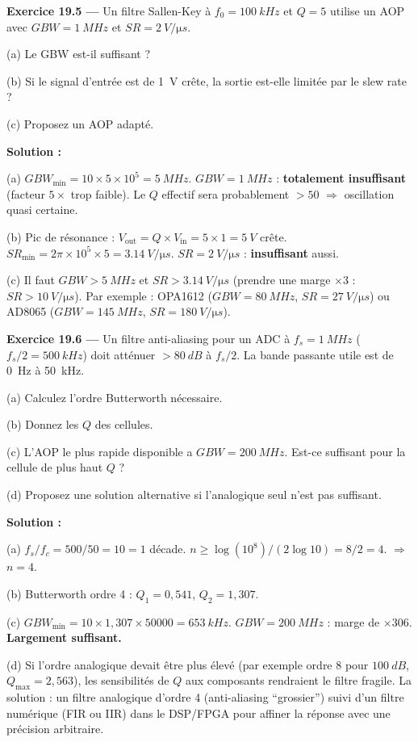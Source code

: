 \documentclass[12pt,a4paper,twoside]{book}
\begin{document}
\textbf{Exercice 19.5 ---} Un filtre Sallen-Key à $f_0 = \SI{100}{kHz}$ et $Q = 5$ utilise un AOP avec $GBW = \SI{1}{MHz}$ et $SR = \SI{2}{V/\micro s}$.

(a) Le GBW est-il suffisant ?

(b) Si le signal d'entrée est de \SI{1}{V} crête, la sortie est-elle limitée par le slew rate ?

(c) Proposez un AOP adapté.

\begin{pratique}
\textbf{Solution :}

(a) $GBW_{\min} = 10\times5\times10^5 = \SI{5}{MHz}$. $GBW = \SI{1}{MHz}$ : \textbf{totalement insuffisant} (facteur $5\times$ trop faible). Le $Q$ effectif sera probablement $> 50$ $\Rightarrow$ oscillation quasi certaine.

(b) Pic de résonance : $V_{\text{out}} = Q\times V_{\text{in}} = 5\times1 = \SI{5}{V}$ crête. $SR_{\min} = 2\pi\times10^5\times5 = \SI{3.14}{V/\micro s}$. $SR = \SI{2}{V/\micro s}$ : \textbf{insuffisant} aussi.

(c) Il faut $GBW > \SI{5}{MHz}$ et $SR > \SI{3.14}{V/\micro s}$ (prendre une marge $\times 3$ : $SR > \SI{10}{V/\micro s}$). Par exemple : OPA1612 ($GBW = \SI{80}{MHz}$, $SR = \SI{27}{V/\micro s}$) ou AD8065 ($GBW = \SI{145}{MHz}$, $SR = \SI{180}{V/\micro s}$).
\end{pratique}

\textbf{Exercice 19.6 ---} Un filtre anti-aliasing pour un ADC à $f_s = \SI{1}{MHz}$ ($f_s/2 = \SI{500}{kHz}$) doit atténuer $> \SI{80}{dB}$ à $f_s/2$. La bande passante utile est de \SI{0}{Hz} à \SI{50}{kHz}.

(a) Calculez l'ordre Butterworth nécessaire.

(b) Donnez les $Q$ des cellules.

(c) L'AOP le plus rapide disponible a $GBW = \SI{200}{MHz}$. Est-ce suffisant pour la cellule de plus haut $Q$ ?

(d) Proposez une solution alternative si l'analogique seul n'est pas suffisant.

\begin{pratique}
\textbf{Solution :}

(a) $f_s/f_c = 500/50 = 10 = 1$ décade. $n \geq \log(10^8)/(2\log10) = 8/2 = 4$. $\Rightarrow$ $n = 4$.

(b) Butterworth ordre 4 : $Q_1 = 0{,}541$, $Q_2 = 1{,}307$.

(c) $GBW_{\min} = 10\times1{,}307\times50000 = \SI{653}{kHz}$. $GBW = \SI{200}{MHz}$ : marge de $\times 306$. \textbf{Largement suffisant.}

(d) Si l'ordre analogique devait être plus élevé (par exemple ordre 8 pour $\SI{100}{dB}$, $Q_{\max} = 2{,}563$), les sensibilités de $Q$ aux composants rendraient le filtre fragile. La solution : un filtre analogique d'ordre 4 (anti-aliasing ``grossier'') suivi d'un filtre numérique (FIR ou IIR) dans le DSP/FPGA pour affiner la réponse avec une précision arbitraire.
\end{pratique}
\end{document}
